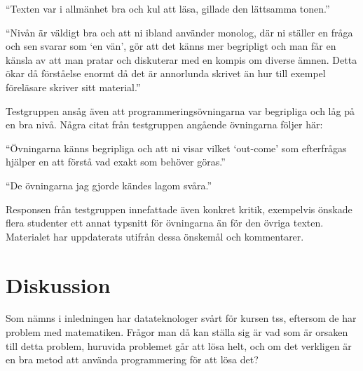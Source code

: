 \documentclass[12pt,a4paper,twoside,openright]{article}
\begin{document}
\begin{displayquote}
  ``Texten var i allmänhet bra och kul att läsa, gillade den
  lättsamma tonen.''
\end{displayquote}

\begin{displayquote}
  ``Nivån är väldigt bra och att ni ibland använder monolog, där
  ni ställer en fråga och sen svarar som `en vän', gör att det känns
  mer begripligt och man får en känsla av att man pratar och
  diskuterar med en kompis om diverse ämnen. Detta ökar då förståelse
  enormt då det är annorlunda skrivet än hur till exempel föreläsare
  skriver sitt material.''
\end{displayquote}

Testgruppen ansåg även att programmeringsövningarna var begripliga och
låg på en bra nivå. Några citat från testgruppen angående övningarna
följer här:

\begin{displayquote}
  ``Övningarna känns begripliga och att ni visar vilket `out-come'
  som efterfrågas hjälper en att förstå vad exakt som behöver göras.''
\end{displayquote}

\begin{displayquote}
  ``De övningarna jag gjorde kändes lagom svåra.''
\end{displayquote}

Responsen från testgruppen innefattade även konkret kritik, exempelvis
önskade flera studenter ett annat typsnitt för övningarna än för den
övriga texten. Materialet har uppdaterats utifrån dessa önskemål och
kommentarer.

\newpage

\section{Diskussion}
\label{sec:diskussion}



Som nämns i inledningen har datateknologer svårt för kursen
\gls{tss}, eftersom de har problem med matematiken. Frågor man då
kan ställa sig är vad som är orsaken till detta problem, huruvida
problemet går att lösa helt, och om det verkligen är en bra metod att
använda programmering för att lösa det?
\end{document}
